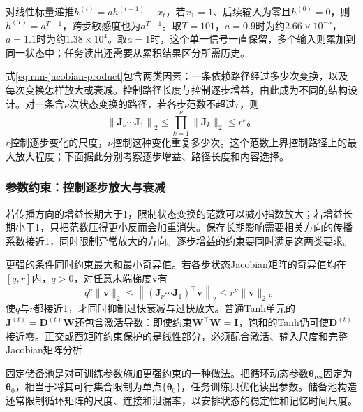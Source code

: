 \begin{example}[传播距离与状态保留]
  \label{ex:rnn-memory-decay}
  对线性标量递推$h^{(t)}=a h^{(t-1)}+x_t$，若$x_1=1$、后续输入为零且$h^{(0)}=0$，则$h^{(T)}=a^{T-1}$，跨步敏感度也为$a^{T-1}$。取$T=101$，$a=0.9$时为约$2.66\times10^{-5}$，$a=1.1$时为约$1.38\times10^4$。取$a=1$时，这个单一信号一直保留，多个输入则累加到同一状态中；任务读出还需要从累积结果区分所需历史。
\end{example}

式\eqref{eq:rnn-jacobian-product}包含两类因素：一条依赖路径经过多少次变换，以及每次变换怎样放大或衰减。控制路径长度与控制逐步增益，由此成为不同的结构设计。对一条含$\nu$次状态变换的路径，若各步范数不超过$r$，则
\begin{equation}
  \left\lVert\bm J_{\nu}\cdots\bm J_1\right\rVert_2
    \leq\prod_{k=1}^{\nu}\lVert\bm J_k\rVert_2\leq r^{\nu}\text{。}
  \label{eq:rnn-path-length-rate}
\end{equation}
$r$控制逐步变化的尺度，$\nu$控制这种变化重复多少次。这个范数上界控制路径上的最大放大程度；下面据此分别考察逐步增益、路径长度和内容选择。

\subsubsection{参数约束：控制逐步放大与衰减}
\label{sec:rnn-parameter-constraints}

若传播方向的增益长期大于1，限制状态变换的范数可以减小指数放大；若增益长期小于1，只把范数压得更小反而会加重消失。保存长期影响需要相关方向的传播系数接近1，同时限制异常放大的方向。逐步增益的约束要同时满足这两类要求。

更强的条件同时约束最大和最小奇异值。若各步状态Jacobian矩阵的奇异值均在$[q,r]$内，$q>0$，对任意末端梯度$\bm v$有
\begin{equation}
  q^{\nu}\lVert\bm v\rVert_2
    \leq\left\lVert(\bm J_{\nu}\cdots\bm J_1)^{\top}\bm v\right\rVert_2
    \leq r^{\nu}\lVert\bm v\rVert_2\text{。}
  \label{eq:rnn-path-singular-bounds}
\end{equation}
使$q$与$r$都接近1，才同时抑制过快衰减与过快放大。普通Tanh单元的$\bm J^{(t)}=\bm D^{(t)}\bm W$还包含激活导数：即使约束$\bm W^{\top}\bm W=\bm I$，饱和的Tanh仍可使$\bm D^{(t)}$接近零。正交或酉矩阵约束保护的是线性部分，必须配合激活、输入尺度和完整Jacobian矩阵分析

固定储备池是对可训练参数施加更强约束的一种做法。把循环动态参数$\bm\theta_{\mathrm{res}}$固定为$\bm\theta_0$，相当于将其可行集合限制为单点$\{\bm\theta_0\}$，任务训练只优化读出参数。储备池构造还常限制循环矩阵的尺度、连接和泄漏率，以安排状态的稳定性和记忆时间尺度。

